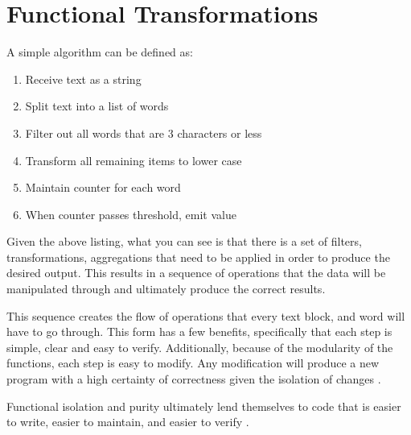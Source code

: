 \chapter{Functional Transformations}

A simple algorithm can be defined as:

\begin{enumerate}
  \item Receive text as a string
  \item Split text into a list of words
  \item Filter out all words that are 3 characters or less
  \item Transform all remaining items to lower case
  \item Maintain counter for each word 
  \item When counter passes threshold, emit value
\end{enumerate}

Given the above listing, what you can see is that there is a set of filters, transformations, aggregations that need to be applied in order to produce the desired output.  This results in a sequence of operations that the data will be manipulated through and ultimately produce the correct results.

This sequence creates the flow of operations that every text block, and word will have to go through.  This form has a few benefits, specifically that each step is simple, clear and easy to verify.  Additionally, because of the modularity of the functions, each step is easy to modify.  Any modification will produce a new program with a high certainty of correctness given the isolation of changes \cite{TODO}.

Functional isolation and purity ultimately lend themselves to code that is easier to write, easier to maintain, and easier to verify \cite{TODO}.


